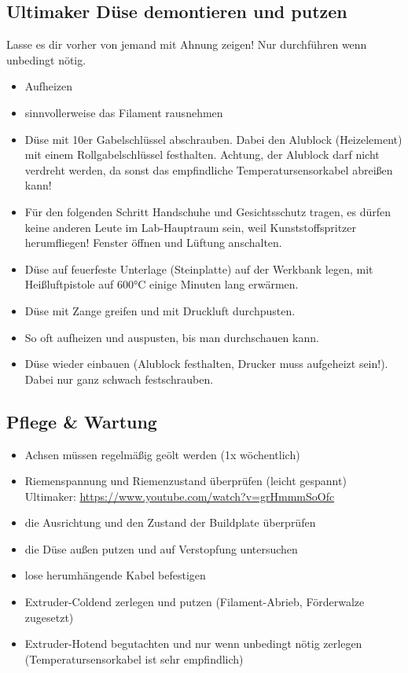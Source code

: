 \documentclass{\basedir/fablab-document}
\begin{document}
\subsection{Ultimaker Düse demontieren und putzen}
Lasse es dir vorher von jemand mit Ahnung zeigen! Nur durchführen wenn unbedingt nötig.
\begin{itemize}
 \item Aufheizen
 \item sinnvollerweise das Filament rausnehmen
 \item Düse mit 10er Gabelschlüssel abschrauben. Dabei den Alublock (Heizelement) mit einem Rollgabelschlüssel festhalten. Achtung, der Alublock darf nicht verdreht werden, da sonst das empfindliche Temperatursensorkabel abreißen kann!
 \item Für den folgenden Schritt Handschuhe und Gesichtsschutz tragen, es dürfen keine anderen Leute im Lab-Hauptraum sein, weil Kunststoffspritzer herumfliegen! Fenster öffnen und Lüftung anschalten.
 \item Düse auf feuerfeste Unterlage (Steinplatte) auf der Werkbank legen, mit Heißluftpistole auf 600°C einige Minuten lang erwärmen. 
 \item Düse mit Zange greifen und mit Druckluft durchpusten.
 \item So oft aufheizen und auspusten, bis man durchschauen kann.
 \item Düse wieder einbauen (Alublock festhalten, Drucker muss aufgeheizt sein!). Dabei nur ganz schwach festschrauben.
\end{itemize}


\subsection{Pflege \& Wartung}

\begin{itemize}
\item Achsen müssen regelmäßig geölt werden (1x wöchentlich)
\item Riemenspannung und Riemenzustand überprüfen (leicht gespannt)\\
Ultimaker: \url{https://www.youtube.com/watch?v=grHmmmSoOfc}
\item die Ausrichtung und den Zustand der Buildplate überprüfen
\item die Düse außen putzen und auf Verstopfung untersuchen
\item lose herumhängende Kabel befestigen
\item Extruder-Coldend zerlegen und putzen (Filament-Abrieb, Förderwalze zugesetzt)
\item Extruder-Hotend begutachten und nur wenn unbedingt nötig zerlegen (Temperatursensorkabel ist sehr empfindlich)
\end{itemize}
\end{document}
